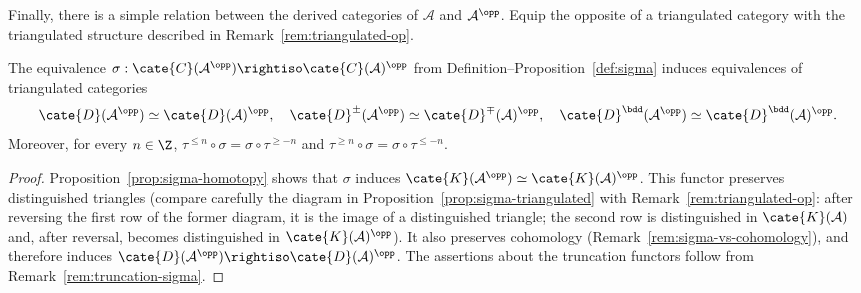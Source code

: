 Finally, there is a simple relation between the derived categories of
$\mathcal{A}$ and $\mathcal{A}^{\opp}$. Equip the opposite of a triangulated
category with the triangulated structure described in
Remark~\ref{rem:triangulated-op}.

\begin{proposition}\label{prop:derived-cat-op}
	The equivalence
	$\sigma: \cate{C}(\mathcal{A}^{\opp}) \rightiso
	\cate{C}(\mathcal{A})^{\opp}$ from
	Definition--Proposition~\ref{def:sigma} induces equivalences of
	triangulated categories
	\[ \cate{D}(\mathcal{A}^{\opp}) \simeq \cate{D}(\mathcal{A})^{\opp}, \quad \cate{D}^\pm(\mathcal{A}^{\opp}) \simeq \cate{D}^\mp(\mathcal{A})^{\opp}, \quad \cate{D}^{\bdd}(\mathcal{A}^{\opp}) \simeq \cate{D}^{\bdd}(\mathcal{A})^{\opp}. \]
	Moreover, for every $n \in \Z$,
	$\tau^{\leq n} \circ \sigma = \sigma \circ \tau^{\geq -n}$ and
	$\tau^{\geq n} \circ \sigma = \sigma \circ \tau^{\leq -n}$.
\end{proposition}

\begin{proof}
	Proposition~\ref{prop:sigma-homotopy} shows that $\sigma$ induces
	$\cate{K}(\mathcal{A}^{\opp}) \simeq
	\cate{K}(\mathcal{A})^{\opp}$. This functor preserves distinguished
	triangles (compare carefully the diagram in
	Proposition~\ref{prop:sigma-triangulated} with
	Remark~\ref{rem:triangulated-op}: after reversing the first row of the
	former diagram, it is the image of a distinguished triangle; the second
	row is distinguished in $\cate{K}(\mathcal{A})$ and, after reversal,
	becomes distinguished in $\cate{K}(\mathcal{A})^{\opp}$). It also
	preserves cohomology (Remark~\ref{rem:sigma-vs-cohomology}), and therefore
	induces
	$\cate{D}(\mathcal{A}^{\opp}) \rightiso
	\cate{D}(\mathcal{A})^{\opp}$. The assertions about the truncation
	functors follow from Remark~\ref{rem:truncation-sigma}.
\end{proof}
